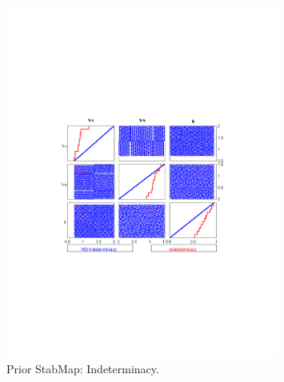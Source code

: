 
\begin{figure}[H]
\centering 
\includegraphics[width=0.8\textwidth]{fiscal/gsa/fiscal_prior_indeterm}
\caption{Prior StabMap: Indeterminacy.}\label{Fig:fiscal_prior_indeterm}
\end{figure}

